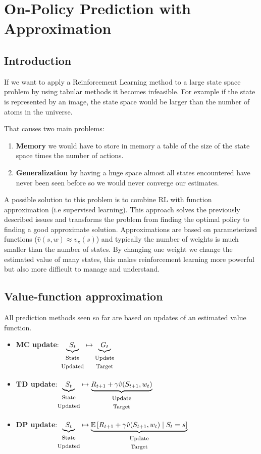 \newcommand{\splittedtext}[2]{\begin{matrix}\mbox{\footnotesize#1}\\\mbox{\footnotesize#2}\end{matrix}}

\section{On-Policy Prediction with Approximation}
\subsection{Introduction}
If we want to apply a Reinforcement Learning method to a large state space problem by using tabular methods it becomes infeasible.
For example if the state is represented by an image, the state space would be larger than the number of atoms in the universe.

That causes two main problems:

\begin{enumerate}
    \item \textbf{Memory} we would have to store in memory a table of the size of the state space times the number of actions.
    \item \textbf{Generalization} by having a huge space almost all states encountered have never been seen before so we would never converge our estimates.
\end{enumerate}

A possible solution to this problem is to combine RL with function approximation (i.e supervised learning).
This approach solves the previously described issues and transforms the problem from finding the optimal policy to finding a good approximate solution. 
Approximations are based on parameterized functions ($\hat{v}(s,w)\approx v_\pi(s)$) and typically the number of weights is much smaller than the number of states.
By changing one weight we change the estimated value of many states, this makes reinforcement learning more powerful but
also more difficult to manage and understand.

\subsection{Value-function approximation}
All prediction methods seen so far are based on updates of an
estimated value function.
\begin{itemize}
    \item \textbf{MC update}: $\underbrace{S_t}_{\splittedtext{State}{Updated}}\mapsto \underbrace{G_t}_{\splittedtext{Update}{Target}}$
    \item \textbf{TD update}:$\underbrace{S_t}_{\splittedtext{State}{Updated}}\mapsto \underbrace{R_{t+1}+\gamma\hat{v}(S_{t+1}, w_t)}_{\splittedtext{Update}{Target}}$
    \item \textbf{DP update}:$\underbrace{S_t}_{\splittedtext{State}{Updated}}\mapsto \underbrace{\EX{[R_{t+1}+\gamma\hat{v}(S_{t+1}, w_t)\;|\;S_t=s]}}_{\splittedtext{Update}{Target}}$
\end{itemize}

